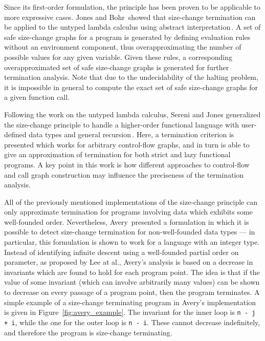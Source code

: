 Since its first-order formulation, the principle has been proven to be applicable to more expressive cases. Jones and Bohr\,\citep{Jones04Untyped} showed that size-change termination can be applied to the untyped lambda calculus using abstract interpretation\,\citep{Jones:1995}. A set of safe size-change graphs for a program is generated by defining evaluation rules without an environment component, thus overapproximating the number of possible values for any given variable. Given these rules, a corresponding overapproximated set of safe size-change graphs is generated for further termination analysis. Note that due to the undecidability of the halting problem, it is impossible in general to compute the exact set of safe size-change graphs for a given function call.

Following the work on the untyped lambda calculus, Sereni and Jones generalized the size-change principle to handle a higher-order functional language with user-defined data types and general recursion\,\citep{Sereni05terminationanalysis,Sereni06Phd}. Here, a termination criterion is presented which works for arbitrary control-flow graphs, and in turn is able to give an approximation of termination for both strict and lazy functional programs. A key point in this work is how different approaches to control-flow and call graph construction may influence the preciseness of the termination analysis.

All of the previously mentioned implementations of the size-change principle can only approximate termination for programs involving data which exhibits some well-founded order. Nevertheless, Avery\,\citep{Avery06} presented a formulation in which it is possible to detect size-change termination for non-well-founded data types --- in particular, this formulation is shown to work for a language with an integer type. Instead of identifying infinite descent using a well-founded partial order on parameter, as proposed by Lee at al., Avery's analysis is based on a decrease in invariants which are found to hold for each program point. The idea is that if the value of some invariant (which can involve arbitrarily many values) can be shown to decrease on every passage of a program point, then the program terminates. A simple example of a size-change terminating program in Avery's implementation is given in Figure~\ref{fig:avery_example}. The invariant for the inner loop is \texttt{n - j + i}, while the one for the outer loop is \texttt{n - i}. These cannot decrease indefinitely, and therefore the program is size-change terminating.

